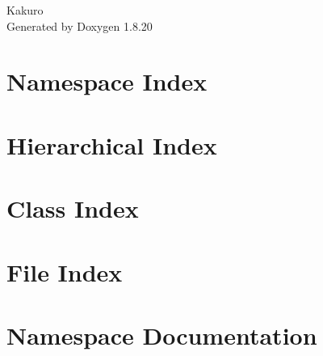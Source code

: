\let\mypdfximage\pdfximage\def\pdfximage{\immediate\mypdfximage}\documentclass[twoside]{book}
\newcommand{\+}{\discretionary{\mbox{\scriptsize$\hookleftarrow$}}{}{}}
\newcommand{\clearemptydoublepage}{%
  \newpage{\pagestyle{empty}\cleardoublepage}%
}
\begin{document}
\hypersetup{pageanchor=false,
             bookmarksnumbered=true,
             pdfencoding=unicode
            }
\begin{titlepage}
\vspace*{7cm}
\begin{center}%
{\Large Kakuro }\\
\vspace*{1cm}
{\large Generated by Doxygen 1.8.20}\\
\end{center}
\end{titlepage}
\clearemptydoublepage
{}
\tableofcontents
\clearemptydoublepage
{}
\hypersetup{pageanchor=true}

\chapter{Namespace Index}

\chapter{Hierarchical Index}

\chapter{Class Index}

\chapter{File Index}

\chapter{Namespace Documentation}









\end{document}
